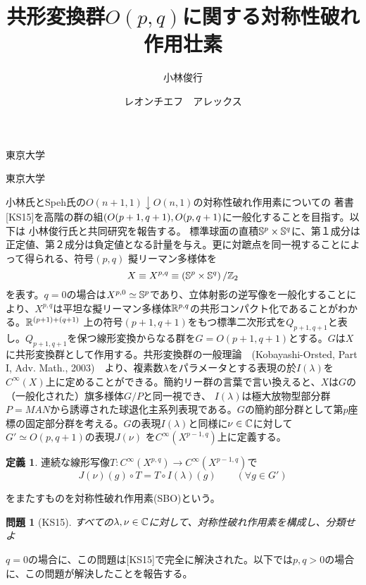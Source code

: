 \documentclass[12pt]{msjproc} %
\newtheorem{question}{問題}
\theoremstyle{definition}
\newtheorem{definition}{定義}
\theoremstyle{remark}
\begin{document}
\title{共形変換群$O(p,q)$に関する対称性破れ作用壮素}

  \author{小林俊行}{東京大学}
  \author{レオンチエフ　アレックス}{東京大学}




  \maketitle

小林氏とSpeh氏の$O(n+1,1)\downarrow O(n,1)$の対称性破れ作用素についての
著書[KS15]\footnotemark[\ref{note1}]を高階の群の組$\left(O(p+1,q+1),O(p,q+1\right)$に一般化することを目指す。以下は
小林俊行氏と共同研究を報告する。
標準球面の直積$\mathbb{S}^p\times\mathbb{S}^q$に、第１成分は正定値、第２成分は負定値となる計量を与え。更に対蹠点を同一視することによって得られる、符号$(p,q)$	擬リーマン多様体を
\begin{equation*}
	X\equiv X^{p,q}\equiv \left( \mathbb{S}^p\times\mathbb{S}^q \right)/\mathbb{Z}_2
\end{equation*}
を表す。$q=0$の場合は$X^{p,0}\simeq \mathbb{S}^p$であり、立体射影の逆写像を一般化することにより、$X^{p,q}$は平坦な擬リーマン多様体$\mathbb{R}^{p,q}$の共形コンパクト化であることがわかる。$\mathbb{R}^{\left( p+ 1\right)+\left( q+ 1\right)}$
上の符号$(p+1,q+1)$をもつ標準二次形式を$Q_{p+1,q+1}$と表し。$Q_{p+1,q+1}$を保つ線形変換からなる群を$G=O(p+1,q+1)$とする。$G$は$X$に共形変換群として作用する。共形変換群の一般理論　(Kobayashi-Orsted, Part I, Adv. Math., 
2003)　より、複素数$\lambda$をパラメータとする表現の於$I(\lambda)$を$C^\infty(X)$上に定めることができる。簡約リー群の言葉で言い換えると、$X$は$G$の（一般化された）旗多様体$G/P$と同一視でき、
$I(\lambda)$は極大放物型部分群$P=MAN$から誘導された球退化主系列表現である。$G$の簡約部分群として第$p$座標の固定部分群を考える。$G$の表現$I(\lambda)$と同様に$\nu\in\mathbb{C}$に対して$G'\simeq O(p,q+1)$の表現$J(\nu)$
を$C^\infty(X^{p-1,q})$上に定義する。
\begin{definition}
	連続な線形写像$T:C^\infty(X^{p,q})\to C^\infty(X^{p-1,q})$で
	\begin{equation*}
		J(\nu)(g)\circ T=T\circ I(\lambda)(g)\qquad(\forall g\in G')
	\end{equation*}
\end{definition}
をまたすものを対称性破れ作用素(SBO)という。
\begin{question}[KS15]
すべての$\lambda,\nu\in\mathbb{C}$に対して、対称性破れ作用素を構成し、分類せよ
\end{question}
$q=0$の場合に、この問題は[KS15]で完全に解決された。以下では$p,q>0$の場合に、この問題が解決したことを報告する。
\end{document}
